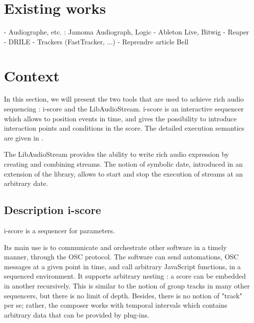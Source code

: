 \documentclass{article}
\begin{document}


\section{Existing works}
- Audiographe, etc. : Jamoma Audiograph, Logic
- Ableton Live, Bitwig
- Reaper
- DRILE
- Trackers (FastTracker, ...)
- Reprendre article Bell

\section{Context}
In this section, we will present the two tools that are used to achieve 
rich audio sequencing : i-score and the LibAudioStream.
i-score is an interactive sequencer which allows to position events 
in time, and gives the possibility to introduce interaction points and 
conditions in the score.
The detailed execution semantics are given in \cite{celerier2015ossia}.

The LibAudioStream\cite{letzlibaudiostream} provides the ability to write rich audio expression
by creating and combining streams. The notion of symbolic date, introduced in an extension of the library,
allows to start and stop the execution of streams at an arbitrary date.

\subsection{Description i-score}
i-score is a sequencer for parameters. 

Its main use is to communicate and orchestrate other software in a timely manner, 
through the OSC protocol.
The software can send automations, OSC messages at a given point in time, and call arbitrary JavaScript functions, in a sequenced environment.
It supports arbitrary nesting : a score can be embedded in another recursively.
This is similar to the notion of group tracks in many other sequencers, but 
there is no limit of depth. 
Besides, there is no notion of "track" per se; rather, the composer works with 
temporal intervals which contains arbitrary data that can be provided by plug-ins.
\end{document}
